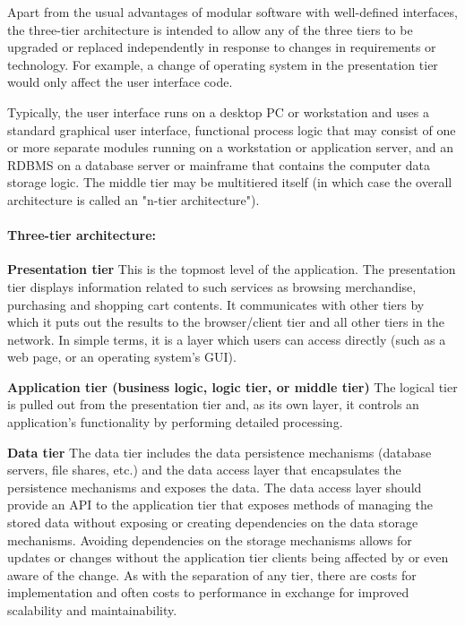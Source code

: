 \documentclass{book}
\begin{document}
Apart from the usual advantages of modular software with well-defined interfaces,
the three-tier architecture is intended to allow any of the three tiers to be upgraded or replaced independently in response to changes in requirements or technology. 
For example, a change of operating system in the presentation tier would only affect the user interface code.

Typically, the user interface runs on a desktop PC or workstation and uses a standard graphical user interface,
functional process logic that may consist of one or more separate modules running on a workstation or application server,
and an RDBMS on a database server or mainframe that contains the computer data storage logic.
The middle tier may be multitiered itself (in which case the overall architecture is called an "n-tier architecture").

\begin{figure}[H]
\begin{floatrow}
\end{floatrow}
\end{figure}
\paragraph{Three-tier architecture:}

\textbf{Presentation tier}
    This is the topmost level of the application. The presentation tier displays information related to such services as browsing merchandise,
    purchasing and shopping cart contents. It communicates with other tiers by which it puts out the results to the browser/client tier and all other tiers in the network.
    In simple terms, it is a layer which users can access directly (such as a web page, or an operating system's GUI).

\textbf{Application tier (business logic, logic tier, or middle tier)}
    The logical tier is pulled out from the presentation tier and, as its own layer, it controls an application’s functionality by performing detailed processing.

\textbf{Data tier}
    The data tier includes the data persistence mechanisms (database servers, file shares, etc.) and the data access layer that encapsulates the persistence mechanisms and exposes the data.
    The data access layer should provide an API to the application tier that exposes methods of managing the stored data without exposing or creating dependencies on the data storage mechanisms.
    Avoiding dependencies on the storage mechanisms allows for updates or changes without the application tier clients being affected by or even aware of the change. As with the separation of any tier,
    there are costs for implementation and often costs to performance in exchange for improved scalability and maintainability.
\end{document}
